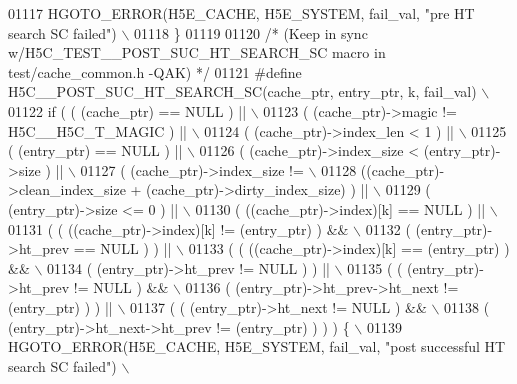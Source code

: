 \begin{DoxyCode}
01117 \textcolor{preprocessor}{    HGOTO\_ERROR(H5E\_CACHE, H5E\_SYSTEM, fail\_val, "pre HT search SC failed") \(\backslash\)}
01118 \textcolor{preprocessor}{\}}
01119 
01120 \textcolor{comment}{/* (Keep in sync w/H5C\_TEST\_\_POST\_SUC\_HT\_SEARCH\_SC macro in test/cache\_common.h -QAK) */}
01121 \textcolor{preprocessor}{#define H5C\_\_POST\_SUC\_HT\_SEARCH\_SC(cache\_ptr, entry\_ptr, k, fail\_val)       \(\backslash\)}
01122 \textcolor{preprocessor}{if ( ( (cache\_ptr) == NULL ) ||                                             \(\backslash\)}
01123 \textcolor{preprocessor}{     ( (cache\_ptr)->magic != H5C\_\_H5C\_T\_MAGIC ) ||                          \(\backslash\)}
01124 \textcolor{preprocessor}{     ( (cache\_ptr)->index\_len < 1 ) ||                                      \(\backslash\)}
01125 \textcolor{preprocessor}{     ( (entry\_ptr) == NULL ) ||                                             \(\backslash\)}
01126 \textcolor{preprocessor}{     ( (cache\_ptr)->index\_size < (entry\_ptr)->size ) ||                     \(\backslash\)}
01127 \textcolor{preprocessor}{     ( (cache\_ptr)->index\_size !=                                           \(\backslash\)}
01128 \textcolor{preprocessor}{       ((cache\_ptr)->clean\_index\_size + (cache\_ptr)->dirty\_index\_size) ) || \(\backslash\)}
01129 \textcolor{preprocessor}{     ( (entry\_ptr)->size <= 0 ) ||                                          \(\backslash\)}
01130 \textcolor{preprocessor}{     ( ((cache\_ptr)->index)[k] == NULL ) ||                                 \(\backslash\)}
01131 \textcolor{preprocessor}{     ( ( ((cache\_ptr)->index)[k] != (entry\_ptr) ) &&                        \(\backslash\)}
01132 \textcolor{preprocessor}{       ( (entry\_ptr)->ht\_prev == NULL ) ) ||                                \(\backslash\)}
01133 \textcolor{preprocessor}{     ( ( ((cache\_ptr)->index)[k] == (entry\_ptr) ) &&                        \(\backslash\)}
01134 \textcolor{preprocessor}{       ( (entry\_ptr)->ht\_prev != NULL ) ) ||                                \(\backslash\)}
01135 \textcolor{preprocessor}{     ( ( (entry\_ptr)->ht\_prev != NULL ) &&                                  \(\backslash\)}
01136 \textcolor{preprocessor}{       ( (entry\_ptr)->ht\_prev->ht\_next != (entry\_ptr) ) ) ||                \(\backslash\)}
01137 \textcolor{preprocessor}{     ( ( (entry\_ptr)->ht\_next != NULL ) &&                                  \(\backslash\)}
01138 \textcolor{preprocessor}{       ( (entry\_ptr)->ht\_next->ht\_prev != (entry\_ptr) ) ) ) \{               \(\backslash\)}
01139 \textcolor{preprocessor}{    HGOTO\_ERROR(H5E\_CACHE, H5E\_SYSTEM, fail\_val, "post successful HT search SC failed") \(\backslash\)}

\end{DoxyCode}

